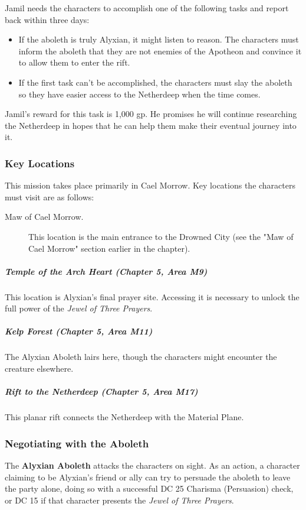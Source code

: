 \documentclass[10pt,a4paper,twoside,fancy,bg=print,twocolumn,openany,nodeprecatedcode]{dndbook}
\begin{document}
Jamil needs the characters to accomplish one of the following tasks and report back within three days:


\begin{itemize}
\item If the aboleth is truly Alyxian, it might listen to reason. The characters must inform the aboleth that they are not enemies of the Apotheon and convince it to allow them to enter the rift.
\item If the first task can't be accomplished, the characters must slay the aboleth so they have easier access to the Netherdeep when the time comes.
\end{itemize}

Jamil's reward for this task is 1,000 gp. He promises he will continue researching the Netherdeep in hopes that he can help them make their eventual journey into it.

\subsubsection{Key Locations}
This mission takes place primarily in Cael Morrow. Key locations the characters must visit are as follows:


\begin{description}
\item[Maw of Cael Morrow.]
This location is the main entrance to the Drowned City (see the "Maw of Cael Morrow" section earlier in the chapter).
\end{description}

\subparagraph{Temple of the Arch Heart (Chapter 5, Area M9)}
This location is Alyxian's final prayer site. Accessing it is necessary to unlock the full power of the \textit{Jewel of Three Prayers}.

\subparagraph{Kelp Forest (Chapter 5, Area M11)}
The Alyxian Aboleth lairs here, though the characters might encounter the creature elsewhere.

\subparagraph{Rift to the Netherdeep (Chapter 5, Area M17)}
This planar rift connects the Netherdeep with the Material Plane.

\subsubsection{Negotiating with the Aboleth}
The \textbf{Alyxian Aboleth} attacks the characters on sight. As an action, a character claiming to be Alyxian's friend or ally can try to persuade the aboleth to leave the party alone, doing so with a successful DC 25 Charisma (Persuasion) check, or DC 15 if that character presents the \textit{Jewel of Three Prayers}.
\end{document}
